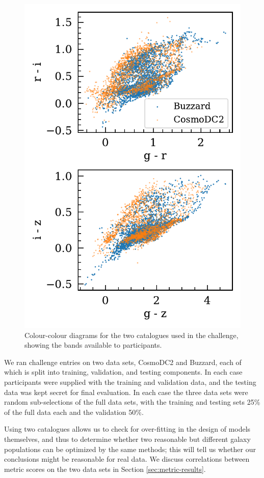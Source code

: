 \documentclass[twocolumn,twocolappendix]{aastex63}
\begin{document}
\begin{figure}[htbp]
	\includegraphics[width=0.9\linewidth]{results/colour_colour.pdf}
	\caption{Colour-colour diagrams for the two catalogues used in the challenge, showing the bands
		available to participants.}
	\label{fig:colour_colour}
\end{figure}

We ran challenge entries on two data sets, CosmoDC2 and Buzzard, each of which is split into training, 
validation, and testing components.  In each case participants were supplied with the training and 
validation data, and the testing data was kept secret for final evaluation. In each case the three
data sets were random sub-selections of the full data sets, with the training and testing sets 25\% of 
the full data each and the validation 50\%. 

Using two catalogues allows us to check
for over-fitting in the design of models themselves, and thus to determine whether two
reasonable but different galaxy populations can be optimized by the same methods; this will
tell us whether our conclusions might be reasonable for real data. We discuss correlations
between metric scores on the two data sets in Section \ref{sec:metric-results}.
\end{document}
